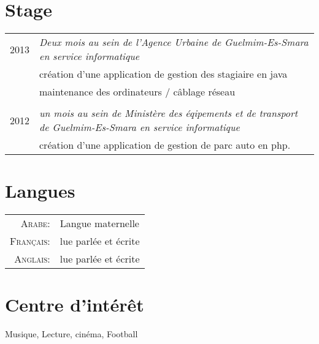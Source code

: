 \documentclass[a4paper,10pt]{article} %
\begin{document}

\section{Stage}

\begin{tabular}{r|p{11cm}}

\textsc{ 2013} & \emph{Deux mois au sein de l'Agence Urbaine de Guelmim-Es-Smara en service informatique}\\ 
& \footnotesize{création d'une application de gestion des stagiaire en java} \\
& \footnotesize{maintenance des ordinateurs / câblage réseau} \\
\multicolumn{2}{c}{} \\


\textsc{ 2012} & \emph{un mois au sein de Ministère des éqipements et de transport de Guelmim-Es-Smara en service informatique}\\ 
& \footnotesize{création d'une application de gestion de parc auto en php}.

\end{tabular}


\section{Langues}

\begin{tabular}{rl}
\textsc{Arabe:} & Langue maternelle\\

\textsc{Français:} & lue parlée et écrite \\

\textsc{Anglais:} & lue parlée et écrite \\
\end{tabular}


\section{Centre d'intérêt }

Musique, Lecture, cinéma, Football \\
\end{document}
